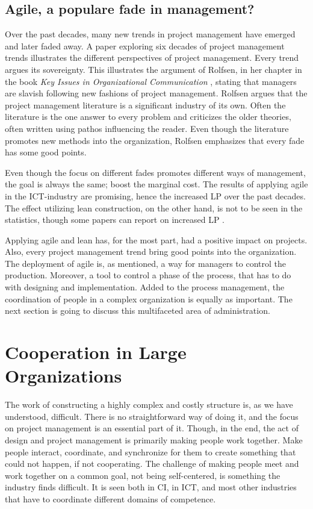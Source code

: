 \subsection{Agile, a populare fade in management?}
Over the past decades, many new trends in project management have emerged and later faded away. A paper \cite{padalkar2016six} exploring six decades of project management trends illustrates the different perspectives of project management. Every trend argues its sovereignty. This illustrates the argument of Rolfsen, in her chapter in the book \textit{Key Issues in Organizational Communication} \cite{rolfsen2004tyranny}, stating that managers are slavish following new fashions of project management. Rolfsen argues that the project management literature is a significant industry of its own. Often the literature is the one answer to every problem and criticizes the older theories, often written using pathos influencing the reader. Even though the literature promotes new methods into the organization, Rolfsen emphasizes that every fade has some good points. 

Even though the focus on different fades promotes different ways of management, the goal is always the same; boost the marginal cost. The results of applying agile in the ICT-industry are promising, hence the increased LP over the past decades. The effect utilizing lean construction, on the other hand, is not to be seen in the statistics, though some papers can report on increased LP \cite{aziz2013applying, ballard1994implementing}.

Applying agile and lean has, for the most part, had a positive impact on projects. Also, every project management trend bring good points into the organization. The deployment of agile is, as mentioned, a way for managers to control the production. Moreover, a tool to control a phase of the process, that has to do with designing and implementation. Added to the process management, the coordination of people in a complex organization is equally as important. The next section is going to discuss this multifaceted area of administration.

\section{Cooperation in Large Organizations}
The work of constructing a highly complex and costly structure is, as we have understood, difficult. There is no straightforward way of doing it, and the focus on project management is an essential part of it. Though, in the end, the act of design and project management is primarily making people work together. Make people interact, coordinate, and synchronize for them to create something that could not happen, if not cooperating. The challenge of making people meet and work together on a common goal, not being self-centered, is something the industry finds difficult. It is seen both in CI, in ICT, and most other industries that have to coordinate different domains of competence. 

